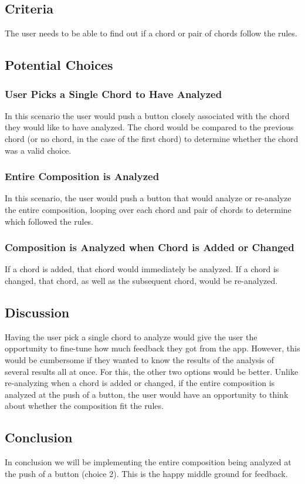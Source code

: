 \documentclass[onecolumn, draftclsnofoot,10pt, compsoc]{IEEEtran}
\begin{document}
\subsection{Criteria}
The user needs to be able to find out if a chord or pair of chords follow the rules. 
\subsection{Potential Choices}
\subsubsection{User Picks a Single Chord to Have Analyzed}
In this scenario the user would push a button closely associated with the chord they would like to have analyzed. The chord would be compared to the previous chord (or no chord, in the case of the first chord) to determine whether the chord was a valid choice. 
\subsubsection{Entire Composition is Analyzed}
In this scenario, the user would push a button that would analyze or re-analyze the entire composition, looping over each chord and pair of chords to determine which followed the rules. 
\subsubsection{Composition is Analyzed when Chord is Added or Changed}
If a chord is added, that chord would immediately be analyzed. If a chord is changed, that chord, as well as the subsequent chord, would be re-analyzed. 
\subsection{Discussion}
Having the user pick a single chord to analyze would give the user the opportunity to fine-tune how much feedback they got from the app. However, this would be cumbersome if they wanted to know the results of the analysis of several results all at once. For this, the other two options would be better. 
Unlike re-analyzing when a chord is added or changed, if the entire composition is analyzed at the push of a button, the user would have an opportunity to think about whether the composition fit the rules. 
\subsection{Conclusion}
In conclusion we will be implementing the entire composition being analyzed at the push of a button (choice 2). This is the happy middle ground for feedback.
\end{document}
